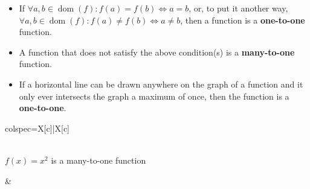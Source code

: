\documentclass[12pt,a4paper,titlepage]{article}
\DeclareMathOperator{\dom}{dom}
\begin{document}
            \begin{SummaryBox}[title=Types of functions (many/one-to-one)]
                \begin{itemize}[leftmargin=*]
                    \item If $\forall a,b \in \dom(f): f(a) = f(b) \iff a = b$, or, to put it another way, $\forall a,b \in \dom(f): f(a) \neq f(b) \iff a \neq b$, then a function is a \textbf{one-to-one} function.
                    \item A function that does not satisfy the above condition(s) is a \textbf{many-to-one} function.
                \end{itemize}
                
                \begin{SummaryExtensionBox}[title=Horizontal line test, center lower]
                    \begin{itemize}[leftmargin=*]
                        \item If a horizontal line can be drawn anywhere on the graph of a function and it only ever intersects the graph a maximum of once, then the function is a \textbf{one-to-one}.
                    \end{itemize}
                    \tcblower
                    \begin{tblr}{colspec={X[c]|X[c]}}
                        {\\
                        $f(x)=x^2$ is a many-to-one function}
                        
                        &
                        

\end{tblr}
\end{SummaryExtensionBox}
\end{SummaryBox}
\end{document}
